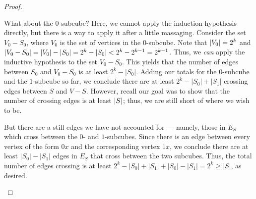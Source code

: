 \documentclass[11pt]{article}
\begin{document}
\begin{proof}
\begin{enumerate}
What about the $0$-subcube? Here, we cannot apply the induction hypothesis directly, but there is a way to apply it after a little massaging. Consider the set $V_0 - S_0$, where $V_0$ is the set of vertices in the $0$-subcube. Note that $\left\lvert V_0 \right\rvert = 2^k$ and $\left\lvert V_0 - S_0 \right\rvert = \left\lvert V_0 \right\rvert - \left\lvert S_0 \right\rvert = 2^k - \left\lvert S_0 \right\rvert < 2^k - 2^{k-1} =2^{k-1}$. Thus, we \emph{can} apply the inductive
hypothesis to the set $V_0 - S_0$. This yields that the number of edges between $S_0$ and
$V_0 - S_0$ is at least $2^{k} - |S_0|$. Adding our totals for the $0$-subcube and the $1$-subcube so far, we conclude there are at least $2^{k} - |S_0| + |S_1|$ crossing edges between $S$ and $V-S$. However, recall our goal was to show that the number of crossing edges is at least $\left\lvert S \right\rvert$; thus, we are still short of where we wish to be.

But there are a still edges we have not accounted for --- namely, those in $E_{S}$ which cross between the $0$- and $1$-subcubes. Since there is an edge between every vertex of the form $0x$ and the corresponding vertex $1x$, we conclude there are at least $|S_0| -|S_1|$ edges in
$E_{S}$ that cross between the two subcubes. Thus, the total number of edges crossing is at least $2^{k} -|S_0| + |S_1| + |S_0| - |S_1| = 2^{k} \geq |S|$, as desired.
\end{enumerate}
\end{proof}
\end{document}
